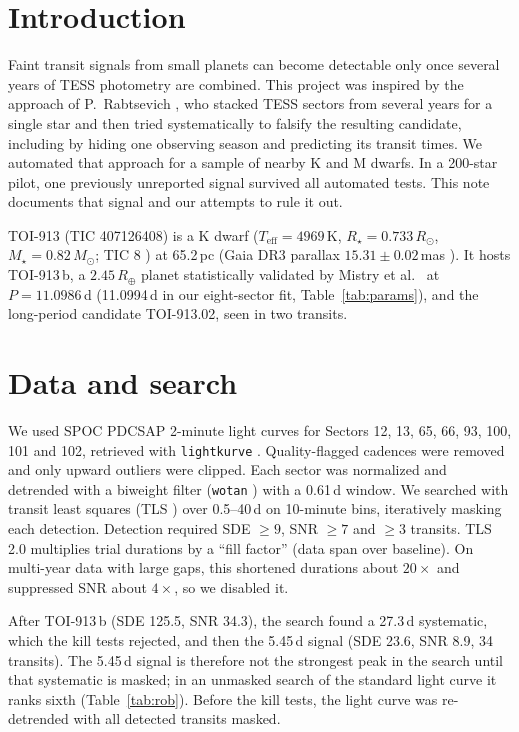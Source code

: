 \documentclass[11pt]{article}
\begin{document}
\section{Introduction}
Faint transit signals from small planets can become detectable only once several years of TESS photometry are combined. This project was inspired by the approach of P.~Rabtsevich \cite{rabtsevich}, who stacked TESS sectors from several years for a single star and then tried systematically to falsify the resulting candidate, including by hiding one observing season and predicting its transit times. We automated that approach for a sample of nearby K and M dwarfs. In a 200-star pilot, one previously unreported signal survived all automated tests. This note documents that signal and our attempts to rule it out.

TOI-913 (TIC 407126408) is a K dwarf ($T_\mathrm{eff}=4969$\,K, $R_\star = 0.733\,R_\odot$, $M_\star = 0.82\,M_\odot$; TIC 8 \cite{stassun}) at 65.2\,pc (Gaia DR3 parallax $15.31\pm0.02$\,mas \cite{gaia}). It hosts TOI-913\,b, a $2.45\,R_\oplus$ planet statistically validated by Mistry et al.\ \cite{mistry} at $P=11.0986$\,d (11.0994\,d in our eight-sector fit, Table~\ref{tab:params}), and the long-period candidate TOI-913.02, seen in two transits.

\section{Data and search}
We used SPOC \cite{jenkins} PDCSAP 2-minute light curves for Sectors 12, 13, 65, 66, 93, 100, 101 and 102, retrieved with \texttt{lightkurve} \cite{lightkurve}. Quality-flagged cadences were removed and only upward outliers were clipped. Each sector was normalized and detrended with a biweight filter (\texttt{wotan} \cite{wotan}) with a 0.61\,d window. We searched with transit least squares (TLS \cite{tls}) over 0.5--40\,d on 10-minute bins, iteratively masking each detection. Detection required SDE $\geq 9$, SNR $\geq 7$ and $\geq 3$ transits. TLS 2.0 multiplies trial durations by a ``fill factor'' (data span over baseline). On multi-year data with large gaps, this shortened durations about $20\times$ and suppressed SNR about $4\times$, so we disabled it.

After TOI-913\,b (SDE 125.5, SNR 34.3), the search found a 27.3\,d systematic, which the kill tests rejected, and then the 5.45\,d signal (SDE 23.6, SNR 8.9, 34 transits). The 5.45\,d signal is therefore not the strongest peak in the search until that systematic is masked; in an unmasked search of the standard light curve it ranks sixth (Table~\ref{tab:rob}). Before the kill tests, the light curve was re-detrended with all detected transits masked.
\end{document}
